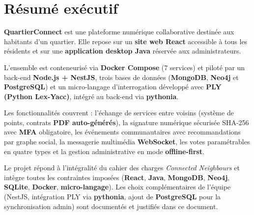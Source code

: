\documentclass[12pt,a4paper]{article}
\begin{document}

\newpage
\tableofcontents
\newpage


\section*{Résumé exécutif}

\begin{resumebox}
    \textbf{QuartierConnect} est une plateforme numérique collaborative destinée aux
    habitants d'un quartier. Elle repose sur un \textbf{site web React} accessible à
    tous les résidents et sur une \textbf{application desktop Java} réservée aux
    administrateurs.

    L'ensemble est conteneurisé via \textbf{Docker Compose} (7 services)
    et piloté par un back-end \textbf{Node.js + NestJS}, trois bases de données
    (\textbf{MongoDB}, \textbf{Neo4j} et \textbf{PostgreSQL}) et un micro-langage d'interrogation développé
    avec \textbf{PLY (Python Lex-Yacc)}, intégré au back-end via \textbf{pythonia}.
    \vspace{5pt}

    Les fonctionnalités couvrent : l'échange de services entre voisins (système de points,
    contrats \textbf{PDF auto-générés}), la signature numérique sécurisée SHA-256 avec \textbf{MFA}
    obligatoire, les événements communautaires avec recommandations par graphe social, la
    messagerie multimédia \textbf{WebSocket}, les votes paramétrables en quatre types et la gestion administrative en mode \textbf{offline-first}.
    \vspace{5pt}

    Le projet répond à l'intégralité du cahier des charges \textit{Connected Neighbours}
    et intègre toutes les contraintes imposées (\textbf{React}, \textbf{Java},
    \textbf{MongoDB}, \textbf{Neo4j}, \textbf{SQLite}, \textbf{Docker}, \textbf{micro-langage}).
    Les choix complémentaires de l'équipe (NestJS, intégration PLY via \textbf{pythonia}, ajout de \textbf{PostgreSQL} pour la synchronisation admin) sont documentés et justifiés dans ce document.
\end{resumebox}

\newpage
\end{document}
